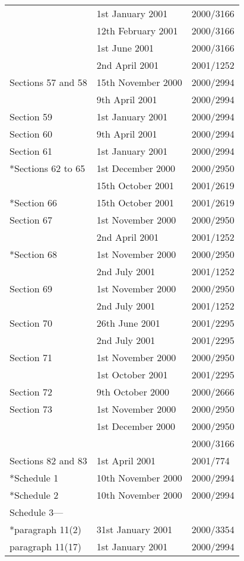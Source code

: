 \documentclass[12pt,a4paper]{article}
\begin{document}
{\begin{longtable}{p{194.81242pt}p{92.22098pt}p{43.81pt}}
	&1st January 2001	&2000/3166\\
	&12th February 2001	&2000/3166\\
	&1st June 2001	&2000/3166\\
	&2nd April 2001	&2001/1252\\
Sections 57 and 58	&15th November 2000	&2000/2994\\
	&9th April 2001	&2000/2994\\
Section 59	&1st January 2001	&2000/2994\\
Section 60	&9th April 2001	&2000/2994\\
Section 61	&1st January 2001	&2000/2994\\
{}*Sections 62 to 65	&1st December 2000	&2000/2950\\
	&15th October 2001	&2001/2619\\
{}*Section 66	&15th October 2001	&2001/2619\\
Section 67	&1st November 2000	&2000/2950\\
	&2nd April 2001	&2001/1252\\
{}*Section 68	&1st November 2000	&2000/2950\\
	&2nd July 2001	&2001/1252\\
Section 69	&1st November 2000	&2000/2950\\
	&2nd July 2001	&2001/1252\\
Section 70	&26th June 2001	&2001/2295\\
	&2nd July 2001	&2001/2295\\
Section 71	&1st November 2000	&2000/2950\\
	&1st October 2001	&2001/2295\\
Section 72	&9th October 2000	&2000/2666\\
Section 73	&1st November 2000	&2000/2950\\
	&1st December 2000	&2000/2950\\
		&&2000/3166\\
Sections 82 and 83	&1st April 2001	&2001/774\\
{}*Schedule 1	&10th November 2000	&2000/2994\\
{}*Schedule 2	&10th November 2000	&2000/2994\\
Schedule 3—		\\
\hspace{1em}{}*paragraph 11(2)	&31st January 2001	&2000/3354\\
\hspace{1em}paragraph 11(17)	&1st January 2001	&2000/2994\\

\end{longtable}}
\end{document}
